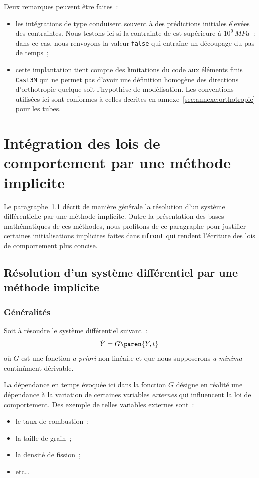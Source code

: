 \documentclass[rectoverso,pleiades,pstricks,leqno,anti]{texmf/note_technique_2010}
\newcommand{\mfront}{\texttt{mfront}}
\newcommand{\castem}{\texttt{Cast3M}}
\begin{document}
Deux remarques peuvent être faites~:
\begin{itemize}
  \item les intégrations de type  conduisent souvent à
  des prédictions initiales élevées des contraintes. Nous testons ici si
  la contrainte de  est supérieure à \(10^{9}\, MPa\)~: dans
  ce cas, nous renvoyons la valeur {\tt false} qui entraîne un découpage
  du pas de temps~;
  \item cette implantation tient compte des limitations du code aux
  éléments finis \castem{} qui ne permet pas d'avoir une définition
  homogène des directions d'orthotropie quelque soit l'hypothèse de
  modélisation. Les conventions utilisées ici sont conformes à celles
  décrites en annexe~\ref{sec:annexe:orthotropie} pour les tubes.
\end{itemize}

\clearpage
\newpage
\section{Intégration des lois de comportement par une méthode implicite}
\label{sec:Implicite}

Le paragraphe~\ref{sec:resol-dun-syst-implicite} décrit de manière
générale la résolution d'un système différentielle par une méthode
implicite. Outre la présentation des bases mathématiques de ces
méthodes, nous profitons de ce paragraphe pour justifier certaines
initialisations implicites faites dans \mfront{} qui rendent l'écriture
des lois de comportement plus concise.

\subsection{Résolution d'un système différentiel par une méthode implicite}
\label{sec:resol-dun-syst-implicite}

\subsubsection{Généralités} Soit à résoudre le système différentiel
suivant~:
\begin{equation}
  \label{eq:systeme_diff-implicite}
  \dot{Y}=G\paren{Y,t}
\end{equation}
où \(G\) est une fonction {\em a priori} non linéaire et que nous
supposerons {\em a minima} continûment dérivable.

La dépendance en temps évoquée ici dans la fonction \(G\) désigne en
réalité une dépendance à la variation de certaines variables {\em
  externes} qui influencent la loi de comportement. Des exemple de
telles variables externes sont~:
\begin{minipage}[t]{0.5\linewidth}
  \begin{itemize}
    \item le taux de combustion~;
    \item la taille de grain~;
    \item la densité de fission~;
    \item etc\ldots
  \end{itemize}
\end{minipage}
\end{document}
